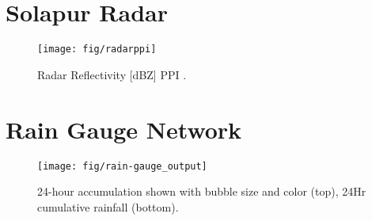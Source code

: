 \documentclass[12pt,a4paper]{article} %
\begin{document}
\section{Solapur Radar}
\begin{figure}[H]
\centering
\texttt{[image: fig/radarppi]}
\caption{Radar Reflectivity [dBZ] PPI .}
\end{figure}



\section{Rain Gauge Network}
\begin{figure}[H]
\centering
\texttt{[image: fig/rain-gauge\_output]}
\caption{24-hour accumulation shown with bubble size and color (top), 24Hr cumulative rainfall (bottom).}

\end{figure}








\end{document}
